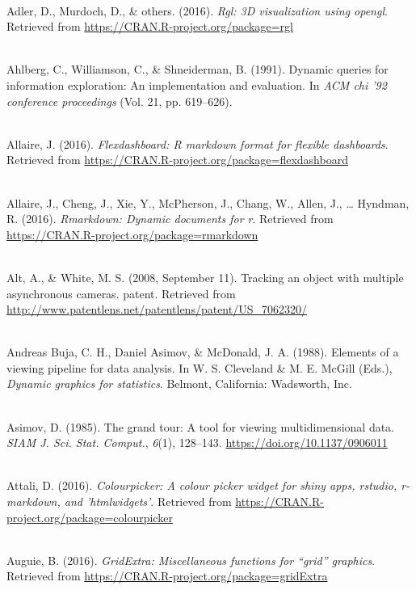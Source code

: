 \documentclass[12pt,]{isuthesis}
\begin{document}

\let\oldhypertarget\hypertarget
\renewcommand{\hypertarget}[2]{\oldhypertarget{#1}{#2}~\\[0in]}

\hypertarget{ref-rgl}{}
Adler, D., Murdoch, D., \& others. (2016). \emph{Rgl: 3D visualization
using opengl}. Retrieved from
\url{https://CRAN.R-project.org/package=rgl}

\hypertarget{ref-Ahlberg:1991}{}
Ahlberg, C., Williamson, C., \& Shneiderman, B. (1991). Dynamic queries
for information exploration: An implementation and evaluation. In
\emph{ACM chi '92 conference proceedings} (Vol. 21, pp. 619--626).

\hypertarget{ref-flexdashboard}{}
Allaire, J. (2016). \emph{Flexdashboard: R markdown format for flexible
dashboards}. Retrieved from
\url{https://CRAN.R-project.org/package=flexdashboard}

\hypertarget{ref-rmarkdown}{}
Allaire, J., Cheng, J., Xie, Y., McPherson, J., Chang, W., Allen, J.,
\ldots{} Hyndman, R. (2016). \emph{Rmarkdown: Dynamic documents for r}.
Retrieved from \url{https://CRAN.R-project.org/package=rmarkdown}

\hypertarget{ref-patent}{}
Alt, A., \& White, M. S. (2008, September 11). Tracking an object with
multiple asynchronous cameras. patent. Retrieved from
\url{http://www.patentlens.net/patentlens/patent/US_7062320/}

\hypertarget{ref-viewing-pipeline}{}
Andreas Buja, C. H., Daniel Asimov, \& McDonald, J. A. (1988). Elements
of a viewing pipeline for data analysis. In W. S. Cleveland \& M. E.
McGill (Eds.), \emph{Dynamic graphics for statistics}. Belmont,
California: Wadsworth, Inc.

\hypertarget{ref-grand-tour}{}
Asimov, D. (1985). The grand tour: A tool for viewing multidimensional
data. \emph{SIAM J. Sci. Stat. Comput.}, \emph{6}(1), 128--143.
\url{https://doi.org/10.1137/0906011}

\hypertarget{ref-colourpicker}{}
Attali, D. (2016). \emph{Colourpicker: A colour picker widget for shiny
apps, rstudio, r-markdown, and 'htmlwidgets'}. Retrieved from
\url{https://CRAN.R-project.org/package=colourpicker}

\hypertarget{ref-gridExtra}{}
Auguie, B. (2016). \emph{GridExtra: Miscellaneous functions for ``grid'' graphics}. Retrieved from \url{https://CRAN.R-project.org/package=gridExtra}
\end{document}
